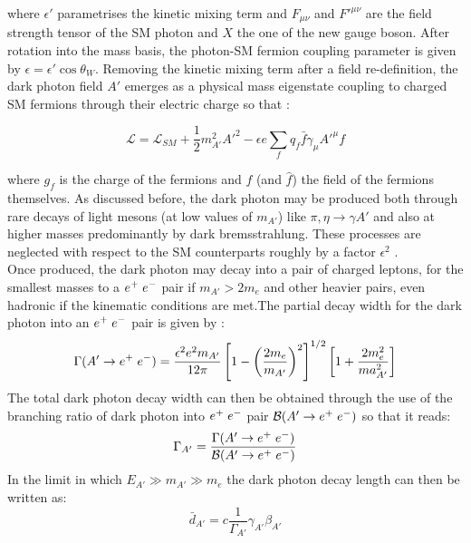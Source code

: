 		where $\epsilon'$ parametrises the kinetic mixing term and $F_{\mu \nu}$ and $F'^{\mu \nu}$ are the field strength tensor of the SM photon and $X$ the one of the new gauge boson. After rotation into the mass basis, the photon-SM fermion coupling parameter is given by $\epsilon = \epsilon' \cos{\theta_W}$. Removing the kinetic mixing term after a field re-definition, the dark photon field $A'$ emerges as a physical mass eigenstate coupling to charged SM fermions through their electric charge so that \cite{FASER_LLP}: 
		
		\begin{equation}
			\mathcal{L} = \mathcal{L}_{SM} + \frac{1}{2} m_{A'}^2A'^2 - \epsilon e \sum_f q_f \bar{f} \gamma_\mu A'^\mu f 
		\end{equation} 
		
		where $g_f$ is the charge of the fermions and $f$ (and $\hat{f}$) the field of the fermions themselves. As discussed before, the dark photon may be produced both through rare decays of light mesons (at low values of $m_{A'}$) like $\pi , \eta \rightarrow \gamma A'$ and also at higher masses predominantly by dark bremsstrahlung. These processes are neglected with respect to the SM counterparts roughly by a factor $\epsilon^2$ \cite{FASER_LLP}. \\ 
		
		Once produced, the dark photon may decay into a pair of charged leptons, for the smallest masses to a $e^+ \hspace{1mm} e^-$ pair if $m_{A'} > 2m_e$ and other heavier pairs, even hadronic if the kinematic conditions are met.The partial decay width for the dark photon into an $e^+ \hspace{1mm} e^-$ pair is given by \cite{dark_photon_Feng} : 
		\begin{equation}
			\Gamma (A' \rightarrow e^+ \hspace{1mm} e^-) = \frac{\epsilon^2 e^2 m_{A'}}{12 \pi} \left[ 1-\left( \frac{2m_e}{m_{A'}} \right)^2 \right]^{1/2} \left[ 1 + \frac{2m_e^2}{ma_{A'}^2} \right] 
		\end{equation}
		The total dark photon decay width can then be obtained through the use of the branching ratio of dark photon into $e^+ \hspace{1mm} e^-$ pair $\mathcal{B}(A' \rightarrow e^+ \hspace{1mm} e^-)$ so that it reads: 
		\begin{equation}
			\Gamma_{A'} = \frac{\Gamma (A' \rightarrow e^+ \hspace{1mm} e^-)}{\mathcal{B}(A' \rightarrow e^+ \hspace{1mm} e^-)}
		\end{equation}
		In the limit in which $E_{A'} \gg m_{A'} \gg m_e$ the dark photon decay length can then be written as: 
		\begin{equation}
			\bar{d}_{A'} = c \frac{1}{\Gamma_{A'}} \gamma_{A'} \beta_{A'} 
		\end{equation}
		

